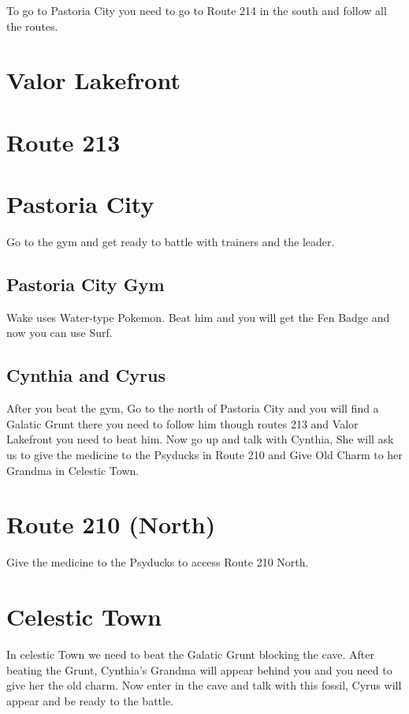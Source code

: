 \documentclass[11pt]{article}
\begin{document}
To go to Pastoria City you need to go to Route 214 in the south and follow all the routes.




\section{Valor Lakefront}\label{sec:Valor_Lakefront}


\section{Route 213}\label{sec:Route_213}



\section{Pastoria City}\label{sec:pastoria-city}
Go to the gym and get ready to battle with trainers and the leader.

\subsection{Pastoria City Gym}\label{subsec:pastoria-city-gym}
Wake uses Water-type Pokemon.
Beat him and you will get the Fen Badge and now you can use Surf.

\subsection{Cynthia and Cyrus}\label{subsec:cynthia-and-cyrus}
After you beat the gym, Go to the north of Pastoria City
and you will find a Galatic Grunt there you need to follow him though routes 213
and Valor Lakefront you need to beat him.
Now go up and talk with Cynthia, She will ask us to give the medicine to the
Psyducks in Route 210 and Give Old Charm to her Grandma in Celestic Town.

\section{Route 210 (North)}\label{sec:route-210-(north)}
Give the medicine to the Psyducks to access Route 210 North.

\section{Celestic Town}\label{sec:celestic-town}
In celestic Town we need to beat the Galatic Grunt blocking the cave.
After beating the Grunt, Cynthia's Grandma will appear behind you
and you need to give her the old charm.
Now enter in the cave and talk with this fossil, Cyrus will appear and be ready to the battle.
\end{document}
